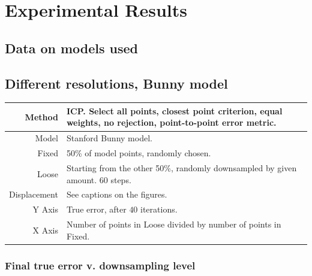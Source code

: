 \chapter{Experimental Results}

\section{Data on models used}

\section{Different resolutions, Bunny model}
\begin{tabularx}{\textwidth}{|r|X|} \hline
Method & ICP. Select all points, closest point criterion, equal weights, no rejection, point-to-point error metric. \\ \hline
Model & Stanford Bunny model. \\ \hline
Fixed & 50\% of model points, randomly chosen. \\ \hline
Loose & Starting from the other 50\%, randomly downsampled by given amount. $60$ steps. \\ \hline
Displacement & See captions on the figures. \\ \hline
Y Axis & True error, after $40$ iterations. \\\hline
X Axis & Number of points in Loose divided by number of points in Fixed. \\ \hline
\end{tabularx}


\subsection{Final true error v. downsampling level} \label{sec:bunny_hilo}

